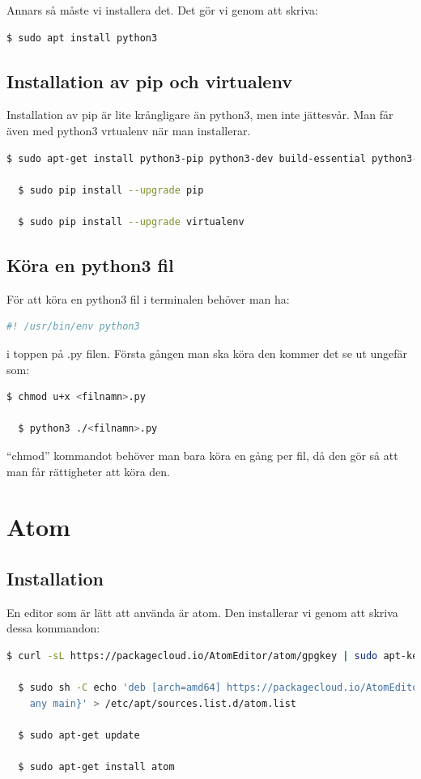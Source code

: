 \documentclass{TDP003mall}
\begin{document}
Annars så måste vi installera det. Det gör vi genom att skriva:
\begin{lstlisting}[language=bash]
  $ sudo apt install python3
\end{lstlisting}

\subsection{Installation av pip och virtualenv}
Installation av pip är lite krångligare än python3, men inte jättesvår.
Man får även med python3 vrtualenv när man installerar.
\begin{lstlisting}[language=bash]
  $ sudo apt-get install python3-pip python3-dev build-essential python3-venv

  $ sudo pip install --upgrade pip

  $ sudo pip install --upgrade virtualenv
\end{lstlisting}

\subsection{Köra en python3 fil}
För att köra en python3 fil i terminalen behöver man ha:
\begin{lstlisting}[language=bash]
  #! /usr/bin/env python3
\end{lstlisting}

i toppen på .py filen. Första gången man ska köra den kommer det se ut
ungefär som:
\begin{lstlisting}[language=bash]
  $ chmod u+x <filnamn>.py

  $ python3 ./<filnamn>.py
\end{lstlisting}
``chmod'' kommandot behöver man bara köra en gång per fil, då den gör så att man
får rättigheter att köra den.

\section{Atom}
\subsection{Installation}
En editor som är lätt att använda är atom. Den installerar vi genom att skriva
dessa kommandon:
\begin{lstlisting}[language=bash]
  $ curl -sL https://packagecloud.io/AtomEditor/atom/gpgkey | sudo apt-key add -

  $ sudo sh -C echo 'deb [arch=amd64] https://packagecloud.io/AtomEditor/atom/any
    any main}' > /etc/apt/sources.list.d/atom.list

  $ sudo apt-get update

  $ sudo apt-get install atom
\end{lstlisting}
\end{document}

